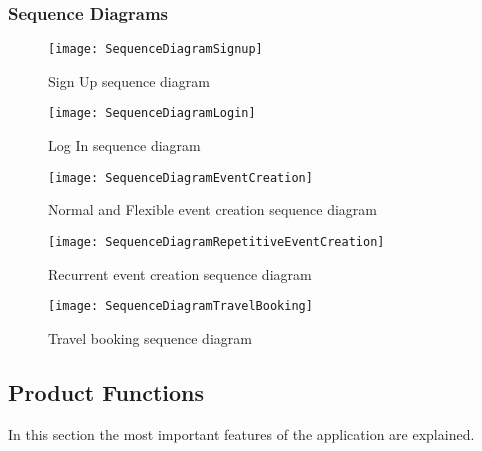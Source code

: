 \subsubsection{Sequence Diagrams}

\begin{figure}[H]
	\centering
	\texttt{[image: SequenceDiagramSignup]}
	\caption{Sign Up sequence diagram}
\end{figure}

\begin{figure}[H]
	\centering
	\texttt{[image: SequenceDiagramLogin]}
	\caption{Log In sequence diagram}
\end{figure}

\begin{figure}[H]
	\centering
	\texttt{[image: SequenceDiagramEventCreation]}
	\caption{Normal and Flexible event creation sequence diagram}
\end{figure}

\begin{figure}[H]
	\centering
	\texttt{[image: SequenceDiagramRepetitiveEventCreation]}
	\caption{Recurrent event creation sequence diagram}
\end{figure}


\begin{figure}[H]
	\centering
	\texttt{[image: SequenceDiagramTravelBooking]}
	\caption{Travel booking sequence diagram}
\end{figure}

\newpage
\subsection{Product Functions}
In this section the most important features of the application are explained.

